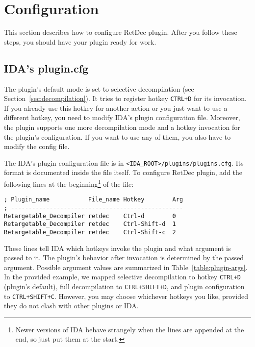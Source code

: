 \documentclass[pdftex, a4paper,12pt, oneside, svgnames]{article}
\begin{document}
\section{Configuration}
\label{sec:configuration}
This section describes how to configure RetDec plugin. After you follow these steps, you should have your plugin ready for work.

\subsection{IDA's plugin.cfg}
\label{sec:config:plugin-cfg}
The plugin's default mode is set to selective decompilation (see Section~\ref{sec:decompilation}). It tries to register hotkey \texttt{CTRL+D} for its invocation. If you already use this hotkey for another action or you just want to use a different hotkey, you need to modify IDA's plugin configuration file. Moreover, the plugin supports one more decompilation mode and a hotkey invocation for the plugin's configuration. If you want to use any of them, you also have to modify the config file.

The IDA's plugin configuration file is in \texttt{<IDA\_ROOT>/plugins/plugins.cfg}. Its format is documented inside the file itself. To configure RetDec plugin, add the following lines at the beginning\footnote{Newer versions of IDA behave strangely when the lines are appended at the end, so just put them at the start.} of the file:
\begin{verbatim}
; Plugin_name           File_name Hotkey        Arg
; -------------------------------------------------
Retargetable_Decompiler retdec    Ctrl-d        0
Retargetable_Decompiler retdec    Ctrl-Shift-d  1
Retargetable_Decompiler retdec    Ctrl-Shift-c  2
\end{verbatim}
These lines tell IDA which hotkeys invoke the plugin and what argument is passed to it. The plugin's behavior after invocation is determined by the passed argument. Possible argument values are summarized in Table~\ref{table:plugin-args}. In the provided example, we mapped selective decompilation to hotkey \texttt{CTRL+D} (plugin's default), full decompilation to \texttt{CTRL+SHIFT+D}, and plugin configuration to \texttt{CTRL+SHIFT+C}. However, you may choose whichever hotkeys you like, provided they do not clash with other plugins or IDA.
\end{document}

